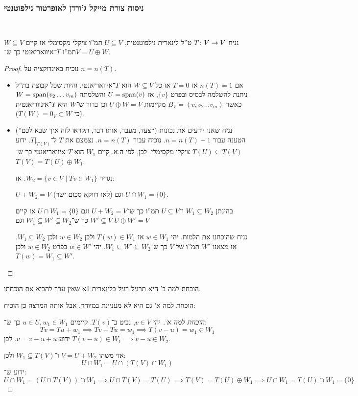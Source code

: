 \documentclass[name=רשימות אלגברה לינארית 2א]{../../../tex/classes/megasumPreamble}
\begin{document}
	\subsubsection{ניסוח צורת מייקל ג'ורדן לאופרטור נילפוטנטי}\ 
	\begin{Theorem}
		נניח $T \colon V \to V$ ט''ל לינארית נילפוטנטית, $U \subseteq V$ תמ''ו ציקלי מקסימלי אז קיים $W \subseteq V$ תמ''ו $T$־איוואריאנטי כך ש־$V = U \oplus W$. 
	\end{Theorem}
	\begin{proof}
		נוכיח באינדוקציה על $n = n(T)$. 
		\begin{itemize}
			\item[בסיס: ]אם $n(T) = 1$ אז $T = 0$ אז כל $W \subseteq V$ הוא $T$־איוואריאנטי. והיות שכל קבוצה בת''ל ניתנת להשלמה לבסיס ובפרט $\{v\}$, אז $U = \operatorname{span}(v)$ והשלמתה $W = \operatorname{span}(v_2 \dots v_m)$ כאשר $B_V = (v, v_2 \dots v_m)$ מקיימות $U \oplus W = V$ וכן ברור ש־$W$ היא $T$־אינווריאנטית (כי $T(W) = 0_V \subset W$). 
			\item[צעד: ](''צעד, מעבר, אותו דבר, תקראו לזה איך שבא לכם``) נניח שאנו יודעים את נכונות הטענה עבור $n = n(T) - 1$. נוכיח עבור $n = n(T)$. נצמצם את $T$ ל־$T|_{{T(V)}}$. ידוע $T(U) \subseteq T(V)$ ציקלי מקסימלי. לכן, לפי ה.א. קיים $W_1$ הוא $T$־איוואריאנטי כך ש־$T(V) = T(U) \oplus W_1$. 
			
			נגדיר $W_2 = \{v \in V \mid Tv \in W_1\}$. אז: 
			\begin{Lemma}[א']
				$U + W_2 = V$ (לאו דווקא סכום ישר) וגם $U \cap W_1 = \{0\}$. 
			\end{Lemma}
			\begin{Lemma}[ב']
				בהינתן $W_1 \subseteq W_2$ ו־$U \subseteq V$ תמ''ו כך ש־$U + W_2 = V$ וגם $U \cap W_1 = \{0\}$ אז קיים $W' \subseteq V$ כך ש־$W_1 \subseteq W' \subseteq W_2$ וגם $U \oplus W' = V$
			\end{Lemma}
			
			
			נניח שהוכחנו את הלמות. יהי $w \in W_1$ אז $T(w) \in W_1$ ולכן $w \in W_2$ ולכן $W_1 \subseteq W_2$.          
			אז מצאנו $W'$ תמ''ו של $V$ כך ש־$W_1 \subseteq W' \subseteq W_2$. יהי $w \in W'$ בפרט $w \in W_2$ ולכן $T(w) = W_1 \subseteq W'$. 
		\end{itemize}\envendproof
	\end{proof}
	
	הוכחת למה ב' היא תרגיל רגיל בלינארית 1א שאין ערך להביא את הוכחתו. 
	
	הוכחת למה א' גם היא לא מעניינת במיוחד, אבל אותה המרצה כן הוכיח: \begin{proof}[הוכחת למה א']
		יהי $v \in V$, נביט ב־$T(v)$. קיימים $u \in U, w_1 \in W_1$ כך ש־: 
		\[ Tv = Tu + w_1 \implies Tv - Tu = w_1 \implies T(v - u) = w_1 \in W_1 \]
		ידוע $v = v - u + u$. לכן $T(v - u) \in W_1 \implies v - u \in W_2$. 
		
		אזי משהו $V = U + W_2$ ו־$W_1 \subseteq T(V)$ ולכן: 
		\[ U \cap W_1 = U \cap (T(V) \cap W_1) \]
		ידוע ש־: 
		\[ U \cap W_1 = (U \cap T(V)) \cap W_1 \implies U \cap T(V) = T(U) \implies T(V) = T(U) \oplus W_1 \implies U \cap W_1 = T(U) \cap W_1 = \{0\} \]
	\end{proof}
	
\end{document}
